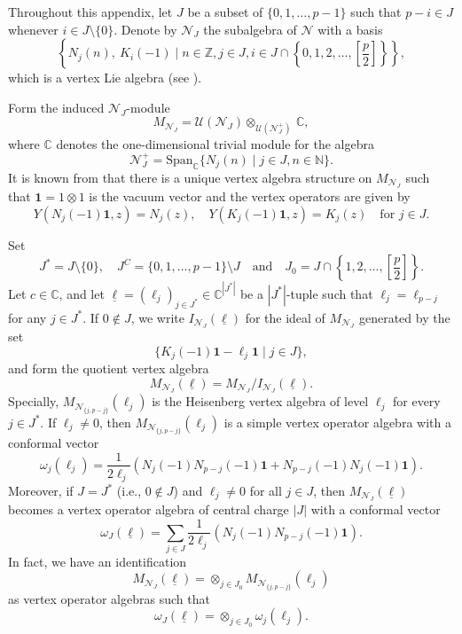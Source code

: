 \documentclass[12pt, reqno]{amsart}
\numberwithin{equation}{section}
\numberwithin{equation}{section}
\def\({\left(}
\def\){\right)}
\def\U{\mathcal{U}}
\newcommand{\C}{\mathbb C}
\newcommand{\N}{\mathbb{N}}
\newcommand{\Z}{\mathbb{Z}}
\begin{document}
Throughout this appendix, let $J$ be a subset of $\{0,1,\dots,p-1\}$ such that  $p-i\in J$ whenever $ i\in J\setminus\{0\}$.
Denote by $\mathcal{N}_J$ the subalgebra of $\mathcal{N}$ with a basis
\begin{equation*} %
 \left\{N_j(n),\ K_i(-1)\mid  n\in \Z, j\in J, i\in J\cap \left\{0,1,2,\dots,[\frac{p}{2}]\right\}\right\},
\end{equation*}
which is a vertex Lie algebra (see \cite[Definition 2.3]{BL}).


Form the induced $\mathcal{N}_J$-module
\begin{equation}\label{defmnj}
 M_{\mathcal{N}_J}=\U(\mathcal{N}_J)\otimes_{\U\(\mathcal{N}^+_J\)}\, \C,
\end{equation}
where $\C$ denotes the one-dimensional trivial module for the algebra
\[
 \mathcal{N}_J^+=\text{Span}_\C \{N_j(n) \mid j\in J, n\in \N \}.
\]
It is known from \cite{DLM, P} that there is a unique vertex algebra structure on $M_{\mathcal{N}_J}$ such that ${\bm 1}=1\otimes 1$ is the vacuum vector and the vertex operators are given by
\[
Y(N_j(-1){\bm 1},z)=N_j(z),\quad Y(K_j(-1){\bm 1},z)=K_j(z)\quad \text{for }j\in J.
\]


Set
\[J^*=J\setminus\{0\},\quad J^C=\{0,1,\dots,p-1\}\setminus J\quad \text{and}\quad J_0=J\cap \left\{1,2,\dots,[\frac{p}{2}]\right\}.\]
Let $c\in \C$, and let $\underline{\ell}=(\ell_j)_{j\in J^*}\in \C^{|J^*|}$ be a $|J^*|$-tuple such that  $\ell_j=\ell_{p-j}$ for any $j\in J^*$.
If $0\notin J$, we write $I_{\mathcal{N}_J}(\underline{\ell})$ for
the ideal of $M_{\mathcal{N}_J}$ generated by the set
\[
\{ K_j(-1){\bm 1}-\ell_j{\bm 1}\mid j\in J\},\] and
form  the quotient vertex algebra
\[
M_{\mathcal{N}_J}(\underline{\ell})=M_{\mathcal{N}_J}/ I_{\mathcal{N}_J}(\underline{\ell}).
\]
Specially, $M_{\mathcal{N}_{\{j,p-j\}}}(\ell_j)$ is the Heisenberg vertex algebra of level $\ell_j$ for every $j\in J^*$.
If $\ell_j\ne 0$, then $M_{\mathcal{N}_{\{j,p-j\}}}(\ell_j)$ is a simple vertex operator algebra
with a conformal vector
\[\omega_{j}(\ell_j)=\frac{1}{2\ell_j}(N_j(-1) N_{p-j}(-1){\bm 1}+N_{p-j}(-1)N_j(-1) {\bm 1}).\]
Moreover, if $J=J^*$ (i.e., $0\notin J$) and $\ell_j\ne 0$ for all $j\in J$,
then $M_{\mathcal{N}_J}(\underline{\ell})$ becomes a vertex operator algebra of central charge $|J|$ with a conformal vector
\[
\omega_J(\underline{\ell})=\sum_{j\in J} \frac{1}{2\ell_j}
(N_j(-1) N_{p-j}(-1){\bm 1}).
\]
In fact, we have an identification
\[
 M_{\mathcal{N}_{J}}(\underline{\ell})= \otimes_{j\in J_0} M_{\mathcal{N}_{\{j,p-j\}}}(\ell_j)
\]
as vertex operator algebras such that
\[
\omega_{J}(\underline{\ell})=\otimes_{j\in J_0} \omega_j(\ell_j).
\]
\end{document}

